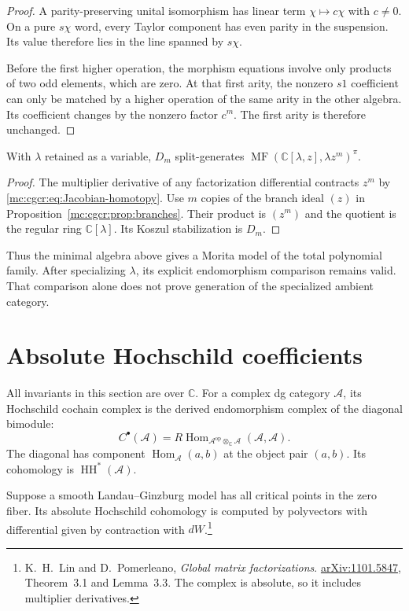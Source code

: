 \begin{proof}
A parity-preserving unital isomorphism has linear term
$\chi\mapsto c\chi$ with $c\ne0$.
On a pure $s\chi$ word, every Taylor component has even
parity in the suspension. Its value therefore lies in
the line spanned by $s\chi$.

Before the first higher operation, the morphism
equations involve only products of two odd elements,
which are zero. At that first arity, the nonzero
$s1$ coefficient can only be matched by a higher
operation of the same arity in the other algebra.
Its coefficient changes by the nonzero factor $c^m$.
The first arity is therefore unchanged.
\end{proof}

\begin{proposition}\label{mc:cgcr:prop:monomial}
With $\lambda$ retained as a variable, $D_m$ split-generates
$\operatorname{MF}(\mathbb C[\lambda,z],\lambda z^m)^\pi$.
\end{proposition}

\begin{proof}
The multiplier derivative of any factorization differential
contracts $z^m$ by \eqref{mc:cgcr:eq:Jacobian-homotopy}.
Use $m$ copies of the branch ideal $(z)$ in
Proposition~\ref{mc:cgcr:prop:branches}. Their product is
$(z^m)$ and the quotient is the regular ring
$\mathbb C[\lambda]$. Its Koszul stabilization is $D_m$.
\end{proof}

Thus the minimal algebra above gives a Morita model of
the total polynomial family. After specializing $\lambda$,
its explicit endomorphism comparison remains valid.
That comparison alone does not prove generation of the
specialized ambient category.

\section{Absolute Hochschild coefficients}

All invariants in this section are over $\mathbb C$.
For a complex dg category $\mathcal A$, its Hochschild
cochain complex is the derived endomorphism complex of
the diagonal bimodule:
\[
 C^\bullet(\mathcal A)=R\operatorname{Hom}_{
     \mathcal A^{\mathrm{op}}\otimes_{\mathbb C}\mathcal A}
                  (\mathcal A,\mathcal A).
\]
The diagonal has component $\operatorname{Hom}_{\mathcal A}(a,b)$
at the object pair $(a,b)$.
Its cohomology is $\operatorname{HH}^*(\mathcal A)$.

Suppose a smooth Landau--Ginzburg model has all critical
points in the zero fiber. Its absolute Hochschild cohomology
is computed by polyvectors with differential given by
contraction with $dW$.\footnote{K.~H.~Lin and D.~Pomerleano,
\emph{Global matrix factorizations}.
\href{https://arxiv.org/abs/1101.5847}{arXiv:1101.5847},
Theorem~3.1 and Lemma~3.3. The complex is absolute,
so it includes multiplier derivatives.}

